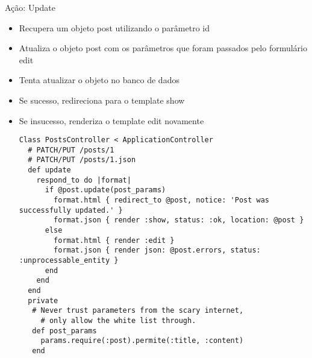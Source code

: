 \begin{frame}{Ação: Update}
	\begin{itemize}
		\item Recupera um objeto \alert{post} utilizando o parâmetro \alert{id}	
		\item Atualiza o objeto \alert{post} com os parâmetros que foram passados pelo
			formulário \alert{edit}
		\item Tenta \alert{atualizar} o objeto no \alert{banco de dados}
		\item Se sucesso, redireciona para o template \alert{show}
		\item Se insucesso, renderiza o template \alert{edit} novamente
		\begin{lstlisting}[style=RubyInputStyle, caption=posts\_controller.rb]
Class PostsController < ApplicationController
  # PATCH/PUT /posts/1
  # PATCH/PUT /posts/1.json
  def update
    respond_to do |format|
      if @post.update(post_params)
        format.html { redirect_to @post, notice: 'Post was successfully updated.' }
        format.json { render :show, status: :ok, location: @post }
      else
        format.html { render :edit }
        format.json { render json: @post.errors, status: :unprocessable_entity }
      end
    end
  end
  private 
   # Never trust parameters from the scary internet, 
	 # only allow the white list through.
   def post_params 
     params.require(:post).permite(:title, :content)
   end 
		\end{lstlisting}				
	\end{itemize}	
\end{frame}


